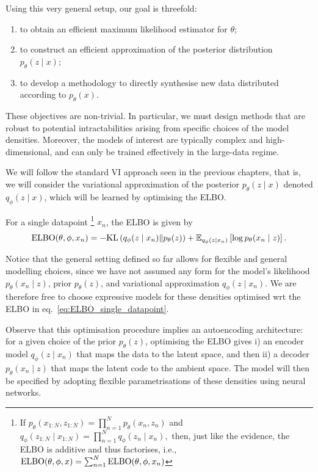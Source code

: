 Using this very general setup, our goal is threefold:
\begin{enumerate}
    \item to obtain an efficient maximum likelihood estimator for $\theta$;
    \item to construct an efficient approximation of the posterior distribution $p_\theta(z \mid x)$;
    \item to develop a methodology to directly synthesise new data distributed according to $p_\theta(x)$.
\end{enumerate}

These objectives are non-trivial. In particular, we must design methods that are robust to potential intractabilities arising from specific choices of the model densities. Moreover, the models of interest are typically complex and high-dimensional, and can only be trained effectively in the large-data regime.


We will follow the standard VI approach seen in the previous chapters, that is, we will consider the variational approximation of the posterior $p_\theta(z \mid x)$ denoted $q_\phi(z \mid x)$, which will be learned by optimising the ELBO. 

For a single datapoint
\footnote{
 If
\(
p_\theta(x_{1:N}, z_{1:N})
=
\prod_{n=1}^N p_\theta(x_n, z_n)
\)
and
\(
q_\phi(z_{1:N} \mid x_{1:N})
=
\prod_{n=1}^N q_\phi(z_n \mid x_n),
\)
then, just like the evidence, the ELBO is additive and thus factorises, i.e., ${\text{ELBO}}(\theta,\phi,x) = \sum_{n=1}^{N} {\text{ELBO}}(\theta,\phi,x_n)$} $x_n$, the ELBO is given by 
\begin{equation}
    {\text{ELBO}}(\theta,\phi,x_n) = -\text{KL}\left(q_\phi(z \mid x_n)\middle\|p_\theta(z)\right) + \mathbb{E}_{q_\phi(z \mid x_n)}\left[\log p_\theta(x_n \mid z)\right].
    \label{eq:ELBO_single_datapoint}
\end{equation}

\begin{remark}
Notice that the general setting defined so far allows for flexible and general modelling choices, since we have not assumed any form for the model's likelihood $p_\theta(x_n \mid z)$, prior $p_\theta(z)$, and variational approximation $q_\phi(z \mid x_n)$. We are therefore free to choose expressive models for these densities optimised wrt the ELBO in eq.~\eqref{eq:ELBO_single_datapoint}. 
\end{remark}

\begin{remark}
Observe that this optimisation procedure implies an autoencoding architecture: for a given choice of the prior  $p_\theta(z)$, optimising the ELBO gives i) an encoder model $q_\phi(z \mid x_n)$ that maps the data to the latent space, and then ii) a decoder $p_\theta(x_n \mid z)$ that maps the latent code to the ambient space. The model will then be specified by adopting flexible parametrisations of these densities using neural networks. 
\end{remark}

